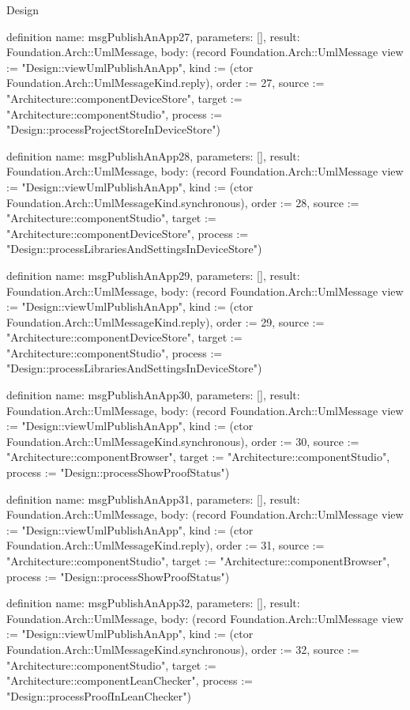 \begin{lexlean}{Design}
\begin{semanticmodule}
definition{
  name: msgPublishAnApp27,
  parameters: [],
  result: Foundation.Arch::UmlMessage,
  body: (record Foundation.Arch::UmlMessage {view := "Design::viewUmlPublishAnApp", kind := (ctor Foundation.Arch::UmlMessageKind.reply), order := 27, source := "Architecture::componentDeviceStore", target := "Architecture::componentStudio", process := "Design::processProjectStoreInDeviceStore"})
}

definition{
  name: msgPublishAnApp28,
  parameters: [],
  result: Foundation.Arch::UmlMessage,
  body: (record Foundation.Arch::UmlMessage {view := "Design::viewUmlPublishAnApp", kind := (ctor Foundation.Arch::UmlMessageKind.synchronous), order := 28, source := "Architecture::componentStudio", target := "Architecture::componentDeviceStore", process := "Design::processLibrariesAndSettingsInDeviceStore"})
}

definition{
  name: msgPublishAnApp29,
  parameters: [],
  result: Foundation.Arch::UmlMessage,
  body: (record Foundation.Arch::UmlMessage {view := "Design::viewUmlPublishAnApp", kind := (ctor Foundation.Arch::UmlMessageKind.reply), order := 29, source := "Architecture::componentDeviceStore", target := "Architecture::componentStudio", process := "Design::processLibrariesAndSettingsInDeviceStore"})
}

definition{
  name: msgPublishAnApp30,
  parameters: [],
  result: Foundation.Arch::UmlMessage,
  body: (record Foundation.Arch::UmlMessage {view := "Design::viewUmlPublishAnApp", kind := (ctor Foundation.Arch::UmlMessageKind.synchronous), order := 30, source := "Architecture::componentBrowser", target := "Architecture::componentStudio", process := "Design::processShowProofStatus"})
}

definition{
  name: msgPublishAnApp31,
  parameters: [],
  result: Foundation.Arch::UmlMessage,
  body: (record Foundation.Arch::UmlMessage {view := "Design::viewUmlPublishAnApp", kind := (ctor Foundation.Arch::UmlMessageKind.reply), order := 31, source := "Architecture::componentStudio", target := "Architecture::componentBrowser", process := "Design::processShowProofStatus"})
}

definition{
  name: msgPublishAnApp32,
  parameters: [],
  result: Foundation.Arch::UmlMessage,
  body: (record Foundation.Arch::UmlMessage {view := "Design::viewUmlPublishAnApp", kind := (ctor Foundation.Arch::UmlMessageKind.synchronous), order := 32, source := "Architecture::componentStudio", target := "Architecture::componentLeanChecker", process := "Design::processProofInLeanChecker"})
}


\end{semanticmodule}
\end{lexlean}
